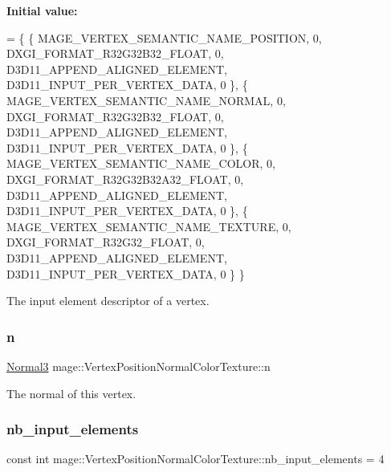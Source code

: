 {\bfseries Initial value\+:}
\begin{DoxyCode}
= \{
        \{ MAGE\_VERTEX\_SEMANTIC\_NAME\_POSITION, 0, DXGI\_FORMAT\_R32G32B32\_FLOAT,    0, 
      D3D11\_APPEND\_ALIGNED\_ELEMENT, D3D11\_INPUT\_PER\_VERTEX\_DATA, 0 \},
        \{ MAGE\_VERTEX\_SEMANTIC\_NAME\_NORMAL,   0, DXGI\_FORMAT\_R32G32B32\_FLOAT,    0, 
      D3D11\_APPEND\_ALIGNED\_ELEMENT, D3D11\_INPUT\_PER\_VERTEX\_DATA, 0 \},
        \{ MAGE\_VERTEX\_SEMANTIC\_NAME\_COLOR,    0, DXGI\_FORMAT\_R32G32B32A32\_FLOAT, 0, 
      D3D11\_APPEND\_ALIGNED\_ELEMENT, D3D11\_INPUT\_PER\_VERTEX\_DATA, 0 \},
        \{ MAGE\_VERTEX\_SEMANTIC\_NAME\_TEXTURE,  0, DXGI\_FORMAT\_R32G32\_FLOAT,       0, 
      D3D11\_APPEND\_ALIGNED\_ELEMENT, D3D11\_INPUT\_PER\_VERTEX\_DATA, 0 \}
    \}
\end{DoxyCode}
The input element descriptor of a vertex. \hypertarget{structmage_1_1_vertex_position_normal_color_texture_a7304bf677ad4f16aea974e63f4324eba}{}\label{structmage_1_1_vertex_position_normal_color_texture_a7304bf677ad4f16aea974e63f4324eba} 
\subsubsection{\texorpdfstring{n}{n}}
{\footnotesize\ttfamily \hyperlink{structmage_1_1_normal3}{Normal3} mage\+::\+Vertex\+Position\+Normal\+Color\+Texture\+::n}

The normal of this vertex. \hypertarget{structmage_1_1_vertex_position_normal_color_texture_a6a4a2cf057a12027ad47df9651021bdb}{}\label{structmage_1_1_vertex_position_normal_color_texture_a6a4a2cf057a12027ad47df9651021bdb} 
\subsubsection{\texorpdfstring{nb\+\_\+input\+\_\+elements}{nb\_input\_elements}}
{\footnotesize\ttfamily const int mage\+::\+Vertex\+Position\+Normal\+Color\+Texture\+::nb\+\_\+input\+\_\+elements = 4\hspace{0.3cm}{\ttfamily [static]}}

